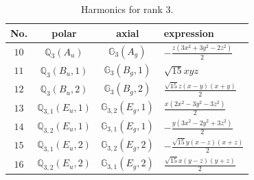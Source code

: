 \documentclass[fleqn,8pt,landscape]{jsarticle}
\begin{document}
\begin{table}[ht!]
\begin{center}
\caption{Harmonics for rank 3.}
\renewcommand{\arraystretch}{1.3}
\begin{tabular}{cccl} \hline \hline
No. & polar & axial & expression \\ \hline
$ 10 $ & $ \mathbb{Q}_{3}(A_{u}) $ & $ \mathbb{G}_{3}(A_{g}) $ & $ - \frac{z \left(3 x^{2} + 3 y^{2} - 2 z^{2}\right)}{2} $ \\
$ 11 $ & $ \mathbb{Q}_{3}(B_{u},1) $ & $ \mathbb{G}_{3}(B_{g},1) $ & $ \sqrt{15} x y z $ \\
$ 12 $ & $ \mathbb{Q}_{3}(B_{u},2) $ & $ \mathbb{G}_{3}(B_{g},2) $ & $ \frac{\sqrt{15} z \left(x - y\right) \left(x + y\right)}{2} $ \\
$ 13 $ & $ \mathbb{Q}_{3,1}(E_{u},1) $ & $ \mathbb{G}_{3,2}(E_{g},1) $ & $ \frac{x \left(2 x^{2} - 3 y^{2} - 3 z^{2}\right)}{2} $ \\
$ 14 $ & $ \mathbb{Q}_{3,2}(E_{u},1) $ & $ \mathbb{G}_{3,1}(E_{g},1) $ & $ - \frac{y \left(3 x^{2} - 2 y^{2} + 3 z^{2}\right)}{2} $ \\
$ 15 $ & $ \mathbb{Q}_{3,1}(E_{u},2) $ & $ \mathbb{G}_{3,2}(E_{g},2) $ & $ - \frac{\sqrt{15} y \left(x - z\right) \left(x + z\right)}{2} $ \\
$ 16 $ & $ \mathbb{Q}_{3,2}(E_{u},2) $ & $ \mathbb{G}_{3,1}(E_{g},2) $ & $ \frac{\sqrt{15} x \left(y - z\right) \left(y + z\right)}{2} $ \\
 \hline \hline
\end{tabular}
\end{center}
\end{table}
\end{document}
